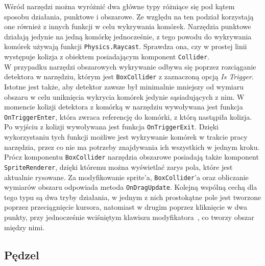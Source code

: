 Wśród narzędzi można wyróżnić dwa główne typy różniące się pod kątem sposobu działania, punktowe i obszarowe.
Ze względu na ten podział korzystają one również z innych funkcji w celu wykrywania komórek.
Narzędzia punktowe działają jedynie na jedną komórkę jednocześnie,
z tego powodu do wykrywania komórek używają funkcji \texttt{Physics.Raycast}.
Sprawdza ona, czy w prostej linii występuje kolizja z obiektem posiadającym komponent \texttt{Collider}.\\
\indent W przypadku narzędzi obszarowych wykrywanie odbywa się poprzez rozciąganie detektora w narzędziu,
którym jest \texttt{BoxCollider} z zaznaczoną opcją \textit{Is Trigger}.
Istotne jest także,
aby detektor zawsze był minimalnie mniejszy od wymiaru obszaru w celu uniknięcia wykrycia komórek jedynie sąsiadujących z nim.
%
W momencie kolizji detektora z komórką w narzędziu wywoływana jest funkcja \texttt{OnTriggerEnter},
która zwraca referencję do komórki, z którą nastąpiła kolizja.
Po wyjściu z kolizji wywoływana jest funkcja \texttt{OnTriggerExit}.
Dzięki wykorzystaniu tych funkcji możliwe jest wykrywanie komórek w trakcie pracy narzędzia,
przez co nie ma potrzeby znajdywania ich wszystkich w jednym kroku.
Prócz komponentu \texttt{BoxCollider} narzędzia obszarowe posiadają także komponent \texttt{SpriteRenderer},
dzięki któremu można wyświetlać zarys pola, które jest aktualnie rysowane.
Za modyfikowanie sprite'a, \texttt{BoxCollider}'a oraz obliczanie wymiarów obszaru odpowiada metoda \texttt{OnDragUpdate}. 
Kolejną wspólną cechą dla tego typu są dwa tryby działania,
w jednym z nich prostokątne pole jest tworzone poprzez przeciągnięcie kursora,
natomiast w drugim poprzez kliknięcie w dwa punkty,
przy jednocześnie wciśniętym klawiszu modyfikatora~, co tworzy obszar między nimi.

\subsection{Pędzel}
\label{subsec:pedzel}

